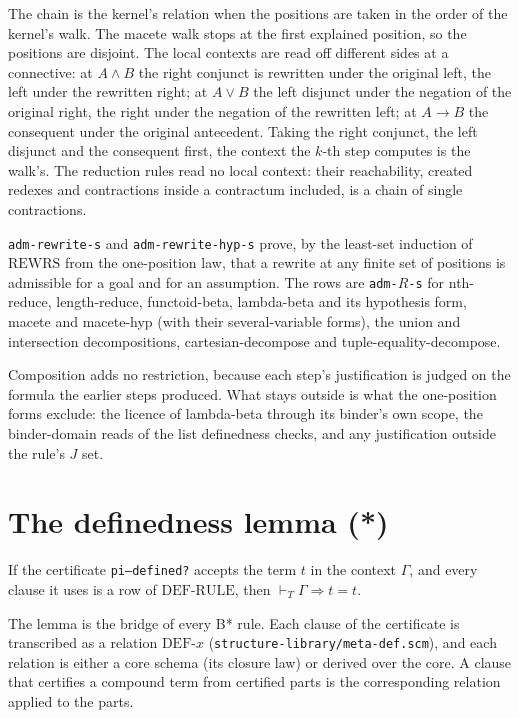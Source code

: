 The chain is the kernel's relation when the positions are taken in the
order of the kernel's walk.  The macete walk stops at the first
explained position, so the positions are disjoint.  The local contexts
are read off different sides at a connective: at $A \wedge B$ the right
conjunct is rewritten under the original left, the left under the
rewritten right; at $A \vee B$ the left disjunct under the negation of
the original right, the right under the negation of the rewritten left;
at $A \to B$ the consequent under the original antecedent.  Taking the
right conjunct, the left disjunct and the consequent first, the context
the $k$-th step computes is the walk's.  The reduction rules read no
local context: their reachability, created redexes and contractions
inside a contractum included, is a chain of single contractions.

\texttt{adm-rewrite-s} and \texttt{adm-rewrite-hyp-s} prove, by the
least-set induction of $\mathrm{REWRS}$ from the one-position law, that a
rewrite at any finite set of positions is admissible for a goal and for
an assumption.  The rows are \texttt{adm-}$R$\texttt{-s} for nth-reduce,
length-reduce, functoid-beta, lambda-beta and its hypothesis form,
macete and macete-hyp (with their several-variable forms), the union and
intersection decompositions, cartesian-decompose and
tuple-equality-decompose.

Composition adds no restriction, because each step's justification is
judged on the formula the earlier steps produced.  What stays outside
is what the one-position forms exclude: the licence of lambda-beta
through its binder's own scope, the binder-domain reads of the list
definedness checks, and any justification outside the rule's $J$ set.

\section{The definedness lemma (*)}\label{sec:meta-lemma-star}

\begin{lem}[(*)]
If the certificate \texttt{pi--defined?} accepts the term $t$ in the
context $\Gamma$, and every clause it uses is a row of
$\mathrm{DEF\text{-}RULE}$, then $\vdash_T \Gamma \Longrightarrow t = t$.
\end{lem}

The lemma is the bridge of every B* rule.  Each clause of the
certificate is transcribed as a relation $\mathrm{DEF\text{-}}x$
(\texttt{structure-library/meta-def.scm}), and each relation is either a
core schema (its closure law) or derived over the core.  A clause that
certifies a compound term from certified parts is the corresponding
relation applied to the parts.


